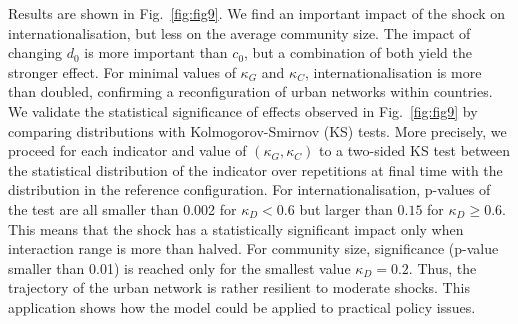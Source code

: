 \documentclass[10pt,letterpaper]{article}
\begin{document}
Results are shown in Fig.~\ref{fig:fig9}. We find an important impact of the shock on internationalisation, but less on the average community size. The impact of changing $d_0$ is more important than $c_0$, but a combination of both yield the stronger effect. For minimal values of $\kappa_G$ and $\kappa_C$, internationalisation is more than doubled, confirming a reconfiguration of urban networks within countries. We validate the statistical significance of effects observed in Fig.~\ref{fig:fig9} by comparing distributions with Kolmogorov-Smirnov (KS) tests. More precisely, we proceed for each indicator and value of $(\kappa_G,\kappa_C)$ to a two-sided KS test between the statistical distribution of the indicator over repetitions at final time with the distribution in the reference configuration. For internationalisation, p-values of the test are all smaller than 0.002 for $\kappa_D < 0.6$ but larger than $0.15$ for $\kappa_D \geq 0.6$. This means that the shock has a statistically significant impact only when interaction range is more than halved. For community size, significance (p-value smaller than 0.01) is reached only for the smallest value $\kappa_D = 0.2$. Thus, the trajectory of the urban network is rather resilient to moderate shocks. This application shows how the model could be applied to practical policy issues.

\end{document}

